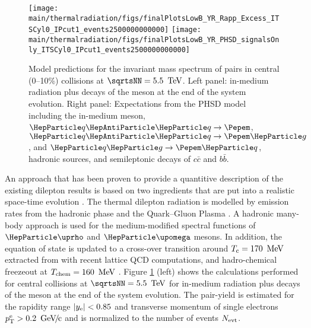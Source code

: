 \documentclass[../report.tex]{subfiles}
\providecommand{\main}{..}
\begin{document}
\begin{figure}[htb]
\centering
\texttt{[image: \\main/thermalradiation/figs/finalPlotsLowB\_YR\_Rapp\_Excess\_ITSCyl0\_IPcut1\_events2500000000000]}
\texttt{[image: \\main/thermalradiation/figs/finalPlotsLowB\_YR\_PHSD\_signalsOnly\_ITSCyl0\_IPcut1\_events2500000000000]}
\caption{Model predictions for the invariant mass spectrum of \Pepem pairs in central (0--10\%) \PbPb{} collisions at $\sqrtsNN = \unit[5.5]{\UTeV}$. Left panel: in-medium radiation plus decays of the \PGr meson at the end of the system evolution. Right panel: Expectations from the PHSD model including the in-medium \PGr meson, $\PQq\PAQq\rightarrow\Pepem$, $\PQq\PAQq\rightarrow\Pepem\Pg$, and $\PQq\Pg\rightarrow\Pepem\PQq$, hadronic sources, and semileptonic decays of $c\bar{c}$ and $b\bar{b}$.}
\label{fig:LHCExpectations_Rapp_pHSD}
\end{figure}

An approach that has been proven to provide a quantitive description of the existing dilepton results \cite{Rapp:2011is} is based on two ingredients that are put into a realistic space-time evolution \cite{Rapp:2000pe}. The thermal dilepton radiation is modelled by emission rates from the hadronic phase and the Quark--Gluon Plasma \cite{vanHees:2007th,Rapp:2009yu}. A hadronic many-body approach \cite{Rapp:1999us} is used for the medium-modified spectral functions of $\PGr$ and $\PGo$ mesons. In addition, the equation of state is updated to a cross-over transition around $T_{\rm c}=\unit[170]{\UMeV}$ extracted from with recent lattice QCD computations, and hadro-chemical freezeout at $T_{\rm chem}=\unit[160]{\UMeV}$ \cite{He:2011zx}. Figure \ref{fig:LHCExpectations_Rapp_pHSD} (left) shows the calculations performed for central \PbPb{} collisions at $\sqrtsNN = \unit[5.5]{\UTeV}$ for in-medium radiation plus decays of the \PGr meson at the end of the system evolution. The pair-yield is estimated for the rapidity range $|y_{\rm e}|<0.85$ and transverse momentum of single electrons $\pT^{\rm e}>\unit[0.2]{\UGeVc}$ and is normalized to the number of events $N_{\rm evt}$. 
 
\end{document}
